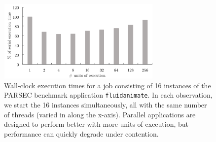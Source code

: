 \begin{figure}
\centering
  \includegraphics[width=8cm,height=4cm]{fig/contention.pdf}
  \caption{Wall-clock execution times for a job consisting of 16 instances of the PARSEC benchmark application \texttt{fluidanimate}. In each observation, we start the 16 instances simultaneously, all with the same number of threads (varied in along the x-axis). Parallel applications are designed to perform better with more units of execution, but performance can quickly degrade under contention.}
  \label{fig:contention-same}
\end{figure}